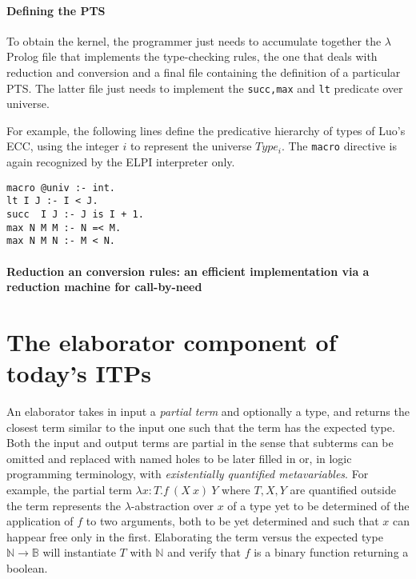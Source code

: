 \documentclass{easychair}
\begin{document}

\paragraph{Defining the PTS}\label{sec:eccpts}
To obtain the kernel, the programmer just needs to accumulate together the $\lambda$Prolog file that implements the type-checking rules, the one that deals with reduction and conversion and a final file containing the definition of a particular PTS. The latter file just needs to implement the \verb+succ,max+ and \verb+lt+ predicate over universe.

For example, the following lines define the predicative hierarchy of types of Luo's ECC, using the integer $i$ to represent the universe $Type_i$. The \verb+macro+ directive is again recognized by the ELPI interpreter only.
\begin{verbatim}
macro @univ :- int.
lt I J :- I < J.
succ  I J :- J is I + 1.
max N M M :- N =< M.
max N M N :- M < N.
\end{verbatim}

\paragraph{Reduction an conversion rules: an efficient implementation via a reduction machine for call-by-need}\label{sec:kernelmachine}



\section{The elaborator component of today's ITPs}\label{sec:problems}

An elaborator takes in input a \emph{partial term} and optionally a
type, and returns the closest term similar to the input one such that
the term has the expected type. Both the input and output terms are
partial in the sense that subterms can be omitted and replaced with
named holes to be later filled in or, in logic programming
terminology, with \emph{existentially quantified metavariables}. For
example, the partial term $\lambda x: T. f~(X~x)~Y$ where $T,X,Y$ are
quantified outside the term represents the $\lambda$-abstraction over
$x$ of a type yet to be determined of the application of $f$ to two
arguments, both to be yet determined and such that $x$ can happear
free only in the first. Elaborating the term versus the expected type
$\mathbb{N} \to \mathbb{B}$ will instantiate $T$ with $\mathbb{N}$ and
verify that $f$ is a binary function returning a boolean.
\end{document}
